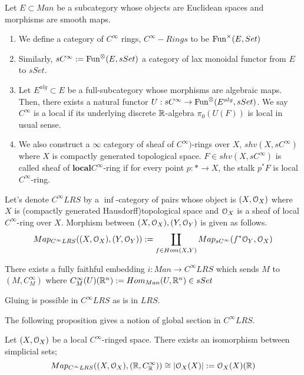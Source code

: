 \begin{defin}
    Let $E \subset Man$ be a subcategory whose objects are Euclidean spaces and morphisms are smooth maps. 
    \begin{enumerate}
        \item We define a category of $C^{\infty}$ rings,  $C^{\infty}-Rings$ to be $\operatorname{Fun}^{\times}(E, Set)$
        \item Similarly, $sC^{\infty} := \operatorname{Fun}^{\otimes}(E, sSet)$ a category of lax monoidal functor from $E$ to $sSet$. 
        \item Let $E^{alg} \subset E$ be a full-subcategory whose morphisms are algebraic maps. Then, there exists a natural functor $U:sC^{\infty} \to \operatorname{Fun}^{\otimes}(E^{alg}, sSet)$. We say $C^{\infty}$ is a local if its underlying discrete $\mathbb R$-algebra $\pi_0(U(F))$ is local in usual sense. 
        \item We also construct a $\infty$ category of sheaf of $C^{\infty})$-rings over $X$, $shv(X,sC^{\infty})$ where $X$ is compactly generated topological space. $F \in shv(X,sC^{\infty})$ is called sheaf of $\textbf{local} C^{\infty}$-ring if for every point $p:* \to X$, the stalk $p^*F$ is local $C^{\infty}$-ring.
    \end{enumerate}
\end{defin}

Let's denote $C^{\infty}LRS$ by a $\inf$-category of pairs whose object is $(X, \mathcal O_X)$ where $X$ is (compactly generated Hausdorff)topological space and $\mathcal O_X$ is a sheaf of local $C^{\infty}$-ring over $X$. Morphism between $(X, \mathcal O_X), (Y, \mathcal O_Y)$ is given as follows.
\begin{equation*}
    Map_{C^{\infty}LRS}((X, \mathcal O_X),(Y, \mathcal O_Y)):= \coprod_{f \in Hom(X,Y)}Map_{sC^{\infty}}(f^*\mathcal O_Y, \mathcal O_X)
\end{equation*}

\begin{prop}\label{emb}
    There exists a fully faithful embedding $i:Man \to C^{\infty}LRS$ which sends $M$ to $(M, C^{\infty}_M)$ where $C^{\infty}_M(U)(\mathbb R^n):=Hom_{Man}(U, \mathbb R^n) \in sSet$
\end{prop}

\begin{rem}
    Gluing is possible in $C^{\infty}LRS$ as is in $LRS$. 
\end{rem}

The following proposition gives a notion of global section in $C^{\infty}LRS$.

\begin{prop}
    Let $(X, \mathcal O_X)$ be a local $C^{\infty}$-ringed space. There exists an isomorphism between simplicial sets; 
    \begin{equation*}
        Map_{C^{\infty}LRS}((X, \mathcal O_X), (\mathbb R, C^{\infty}_{\mathbb R})) \cong |\mathcal O_X(X)|:=\mathcal O_X(X)(\mathbb R)
    \end{equation*}
\end{prop}

